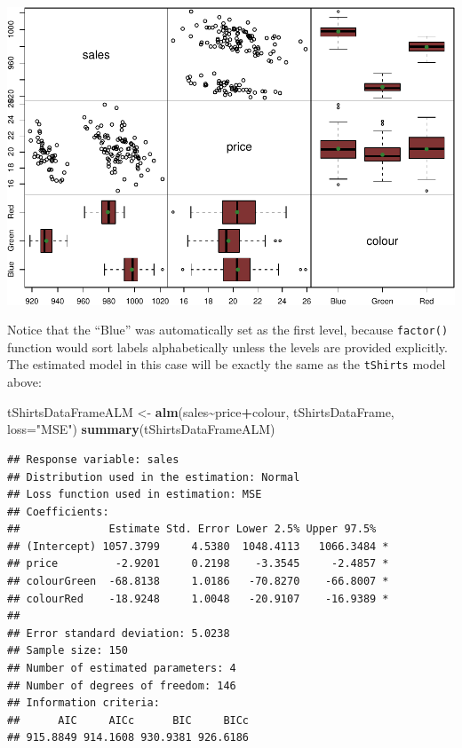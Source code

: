 \documentclass[
]{book}
\newenvironment{Shaded}{\begin{snugshade}}{\end{snugshade}}
\newcommand{\AttributeTok}[1]{\textcolor[rgb]{0.13,0.29,0.53}{#1}}
\newcommand{\FunctionTok}[1]{\textcolor[rgb]{0.13,0.29,0.53}{\textbf{#1}}}
\newcommand{\NormalTok}[1]{#1}
\newcommand{\OtherTok}[1]{\textcolor[rgb]{0.56,0.35,0.01}{#1}}
\newcommand{\SpecialCharTok}[1]{\textcolor[rgb]{0.81,0.36,0.00}{\textbf{#1}}}
\newcommand{\StringTok}[1]{\textcolor[rgb]{0.31,0.60,0.02}{#1}}
\theoremstyle{definition}
\theoremstyle{definition}
\theoremstyle{definition}
\theoremstyle{definition}
\theoremstyle{remark}
\begin{document}
\includegraphics{Svetunkov---Statistics-for-Business-Analytics_files/figure-latex/unnamed-chunk-90-1.pdf}

Notice that the ``Blue'' was automatically set as the first level, because \texttt{factor()} function would sort labels alphabetically unless the levels are provided explicitly. The estimated model in this case will be exactly the same as the \texttt{tShirts} model above:

\begin{Shaded}
\begin{Highlighting}[]
\NormalTok{tShirtsDataFrameALM }\OtherTok{\textless{}{-}} \FunctionTok{alm}\NormalTok{(sales}\SpecialCharTok{\textasciitilde{}}\NormalTok{price}\SpecialCharTok{+}\NormalTok{colour, tShirtsDataFrame, }\AttributeTok{loss=}\StringTok{"MSE"}\NormalTok{)}
\FunctionTok{summary}\NormalTok{(tShirtsDataFrameALM)}
\end{Highlighting}
\end{Shaded}

\begin{verbatim}
## Response variable: sales
## Distribution used in the estimation: Normal
## Loss function used in estimation: MSE
## Coefficients:
##              Estimate Std. Error Lower 2.5% Upper 97.5%  
## (Intercept) 1057.3799     4.5380  1048.4113   1066.3484 *
## price         -2.9201     0.2198    -3.3545     -2.4857 *
## colourGreen  -68.8138     1.0186   -70.8270    -66.8007 *
## colourRed    -18.9248     1.0048   -20.9107    -16.9389 *
## 
## Error standard deviation: 5.0238
## Sample size: 150
## Number of estimated parameters: 4
## Number of degrees of freedom: 146
## Information criteria:
##      AIC     AICc      BIC     BICc 
## 915.8849 914.1608 930.9381 926.6186
\end{verbatim}
\end{document}
